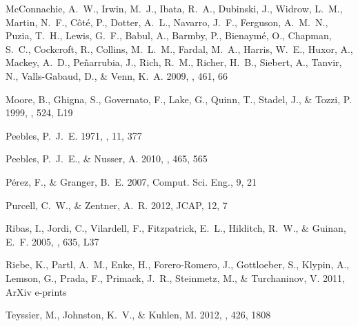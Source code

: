 \documentclass{emulateapj}
\begin{document}
\begin{thebibliography}{30}
{McConnachie}, A.~W., {Irwin}, M.~J., {Ibata}, R.~A., {Dubinski}, J., {Widrow},
  L.~M., {Martin}, N.~F., {C{\^o}t{\'e}}, P., {Dotter}, A.~L., {Navarro},
  J.~F., {Ferguson}, A.~M.~N., {Puzia}, T.~H., {Lewis}, G.~F., {Babul}, A.,
  {Barmby}, P., {Bienaym{\'e}}, O., {Chapman}, S.~C., {Cockcroft}, R.,
  {Collins}, M.~L.~M., {Fardal}, M.~A., {Harris}, W.~E., {Huxor}, A., {Mackey},
  A.~D., {Pe{\~n}arrubia}, J., {Rich}, R.~M., {Richer}, H.~B., {Siebert}, A.,
  {Tanvir}, N., {Valls-Gabaud}, D., \& {Venn}, K.~A. 2009, \nat, 461, 66

{Moore}, B., {Ghigna}, S., {Governato}, F., {Lake}, G., {Quinn}, T., {Stadel},
  J., \& {Tozzi}, P. 1999, \apjl, 524, L19

{Peebles}, P.~J.~E. 1971, \aap, 11, 377

{Peebles}, P.~J.~E., \& {Nusser}, A. 2010, \nat, 465, 565

P\'erez, F., \& Granger, B.~E. 2007, {C}omput. {S}ci. {E}ng., 9, 21

{Purcell}, C.~W., \& {Zentner}, A.~R. 2012, {JCAP}, 12, 7

{Ribas}, I., {Jordi}, C., {Vilardell}, F., {Fitzpatrick}, E.~L., {Hilditch},
  R.~W., \& {Guinan}, E.~F. 2005, \apjl, 635, L37

{Riebe}, K., {Partl}, A.~M., {Enke}, H., {Forero-Romero}, J., {Gottloeber}, S.,
  {Klypin}, A., {Lemson}, G., {Prada}, F., {Primack}, J.~R., {Steinmetz}, M.,
  \& {Turchaninov}, V. 2011, ArXiv e-prints

{Teyssier}, M., {Johnston}, K.~V., \& {Kuhlen}, M. 2012, \mnras, 426, 1808


\end{thebibliography}
\end{document}
